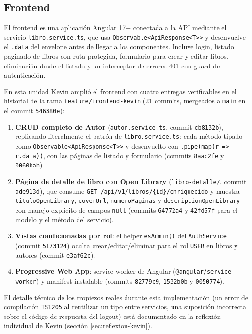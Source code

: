 \documentclass[12pt,a4paper]{article}
\begin{document}
\subsection{Frontend}

El frontend es una aplicación Angular 17+ conectada a la API mediante el servicio
\texttt{libro.service.ts}, que usa \texttt{Observable<ApiResponse<T>>} y desenvuelve el
\texttt{.data} del envelope antes de llegar a los componentes. Incluye login, listado
paginado de libros con ruta protegida, formulario para crear y editar libros,
eliminación desde el listado y un interceptor de errores 401 con guard de autenticación.

En esta unidad Kevin amplió el frontend con cuatro entregas verificables en el
historial de la rama \texttt{feature/frontend-kevin} (21 commits, mergeados a
\texttt{main} en el commit \texttt{546380e}):

\begin{enumerate}[leftmargin=1.2cm]
  \item \textbf{CRUD completo de Autor} (\texttt{autor.service.ts}, commit
        \texttt{cb8132b}), replicando literalmente el patrón de
        \texttt{libro.service.ts}: cada método tipado como
        \texttt{Observable<ApiResponse<T>>} y desenvuelto con
        \texttt{.pipe(map(r => r.data))}, con las páginas de listado y formulario
        (commits \texttt{8aac2fe} y \texttt{0060bab}).
  \item \textbf{Página de detalle de libro con Open Library} (\texttt{libro-detalle/},
        commit \texttt{ade913d}), que consume
        \texttt{GET /api/v1/libros/\{id\}/enriquecido} y muestra
        \texttt{tituloOpenLibrary}, \texttt{coverUrl}, \texttt{numeroPaginas} y
        \texttt{descripcionOpenLibrary} con manejo explícito de campos \texttt{null}
        (commits \texttt{64772a4} y \texttt{42fd57f} para el modelo y el método del
        servicio).
  \item \textbf{Vistas condicionadas por rol}: el helper \texttt{esAdmin()} del
        \texttt{AuthService} (commit \texttt{5173124}) oculta crear/editar/eliminar
        para el rol \texttt{USER} en libros y autores (commit \texttt{e3af62c}).
  \item \textbf{Progressive Web App}: service worker de Angular
        (\texttt{@angular/service-worker}) y manifest instalable (commits
        \texttt{82779c9}, \texttt{1532b0b} y \texttt{0050774}).
\end{enumerate}

El detalle técnico de los tropiezos reales durante esta implementación (un error de
compilación \texttt{TS1205} al reutilizar un tipo entre servicios, una suposición
incorrecta sobre el código de respuesta del logout) está documentado en la reflexión
individual de Kevin (sección \ref{sec:reflexion-kevin}).
\end{document}
